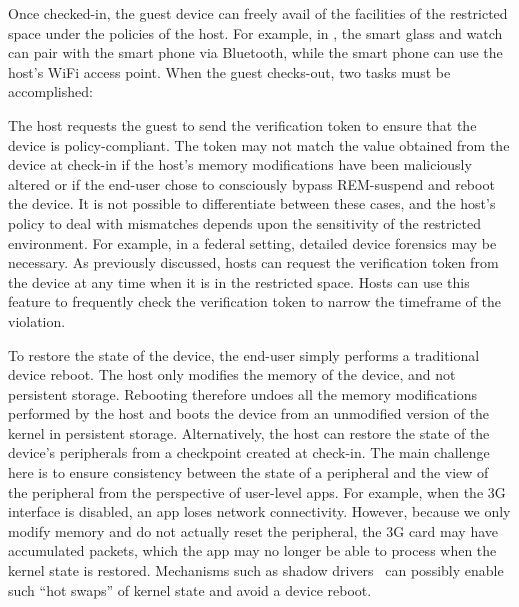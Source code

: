  Once checked-in, the guest device can freely avail of
the facilities of the restricted space under the policies of the host. For
example, in , the smart glass and watch can
pair with the smart phone via Bluetooth, while the smart phone can use the
host's WiFi access point. When the guest checks-out, two tasks must be
accomplished:
%
\begin{mylist}
%
\item {} The host requests the guest to send
the verification token to ensure that the device is policy-compliant. The token
may not match the value obtained from the device at check-in if the host's
memory modifications have been maliciously altered or if the end-user chose to
consciously bypass REM-suspend and reboot the device.  It is not possible to
differentiate between these cases, and the host's policy to deal with
mismatches depends upon the sensitivity of the restricted environment. For
example, in a federal setting, detailed device forensics may be necessary. As
previously discussed, hosts can request the verification token from the device
at any time when it is in the restricted space. Hosts can use this feature to
frequently check the verification token to narrow the timeframe of the
violation.

\item {} To restore the state of the device, the
end-user simply performs a traditional device reboot. The host only modifies
the memory of the device, and not persistent storage. Rebooting therefore
undoes all the memory modifications performed by the host and boots the device
from an unmodified version of the kernel in persistent storage. Alternatively,
the host can restore the state of the device's peripherals from a checkpoint
created at check-in. The main challenge here is to ensure consistency between
the state of a peripheral and the view of the peripheral from the perspective
of user-level apps. For example, when the 3G interface is disabled, an app
loses network connectivity. However, because we only modify memory and do not
actually reset the peripheral, the 3G card may have accumulated packets, which
the app may no longer be able to process when the kernel state is restored.
Mechanisms such as shadow drivers~\cite{shadow:tocs06} can possibly enable 
such ``hot swaps'' of kernel state and avoid a device reboot.
%
\end{mylist}

